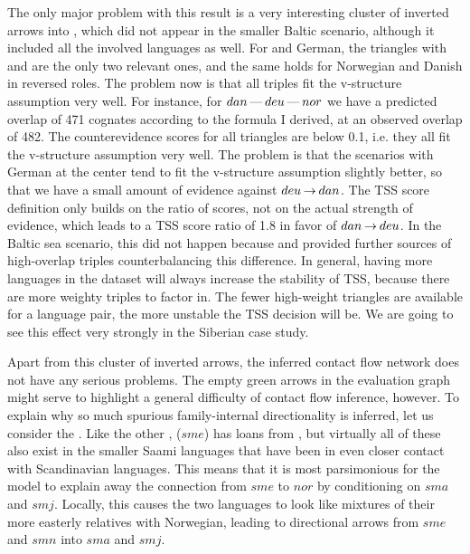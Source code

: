 The only major problem with this result is a very interesting cluster of inverted arrows into , which did not appear in the smaller Baltic scenario, although it included all the involved languages as well. For  and German, the triangles with  and  are the only two relevant ones, and the same holds for Norwegian and Danish in reversed roles. The problem now is that all triples fit the v-structure assumption very well. For instance, for $dan \kern 2pt\hbox{---}\kern 2pt deu \kern 2pt\hbox{---}\kern 2pt nor$ we have a predicted overlap of 471 cognates according to the formula I derived, at an observed overlap of 482. The counterevidence scores for all triangles are below 0.1, i.e. they all fit the v-structure assumption very well. The problem is that the scenarios with German at the center tend to fit the v-structure assumption slightly better, so that we have a small amount of evidence against $deu \kern 2pt\hbox{$\rightarrow$}\kern 2pt dan$. The TSS score definition only builds on the ratio of scores, not on the actual strength of evidence, which leads to a TSS score ratio of 1.8 in favor of $dan \kern 2pt\hbox{$\rightarrow$}\kern 2pt deu$. In the Baltic sea scenario, this did not happen because  and  provided further sources of high-overlap triples counterbalancing this difference. In general, having more languages in the dataset will always increase the stability of TSS, because there are more weighty triples to factor in. The fewer high-weight triangles are available for a language pair, the more unstable the TSS decision will be. We are going to see this effect very strongly in the Siberian case study.

Apart from this cluster of inverted arrows, the inferred contact flow network does not have any serious problems. The empty green arrows in the evaluation graph might serve to highlight a general difficulty of contact flow inference, however. To explain why so much spurious family-internal directionality is inferred, let us consider the . Like the other ,  ($sme$) has loans from , but virtually all of these also exist in the smaller Saami languages that have been in even closer contact with Scandinavian languages. This means that it is most parsimonious for the model to explain away the connection from $sme$ to $nor$ by conditioning on $sma$ and $smj$. Locally, this causes the two languages to look like mixtures of their more easterly relatives with Norwegian, leading to directional arrows from $sme$ and $smn$ into $sma$ and $smj$.

